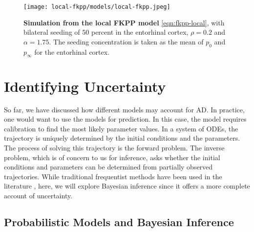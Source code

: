 \begin{figure}[H]
    \centering
    \texttt{[image: local-fkpp/models/local-fkpp.jpeg]}
    \caption{\textbf{Simulation from the local FKPP model} \cref{eqn:fkpp-local}, 
    with bilateral seeding of 50 percent in the entorhinal cortex, $\rho = 0.2$
    and $\alpha = 1.75$. The seeding concentration is taken as the mean of $p_0$
    and $p_\infty$ for the entorhinal cortex.}
    \label{fig:fkpp-local}
\end{figure}


\section{Identifying Uncertainty}
\label{sec:inference-example}
So far, we have discussed how different models may account for AD. In practice,
one would want to use the models for prediction. In this case, the model
requires calibration to find the most likely parameter values. In a system of
ODEs, the trajectory is uniquely determined by the initial conditions and the
parameters. The process of solving this trajectory is the forward problem. The
inverse problem, which is of concern to us for inference, asks whether the
initial conditions and parameters can be determined from partially observed
trajectories. While traditional frequentist methods have been used in the
literature \cite{raj2015network,vogel2020spread}, here, we will explore Bayesian
inference since it offers a more complete account of uncertainty.

\subsection{Probabilistic Models and Bayesian Inference}

